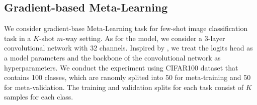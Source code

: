 



\subsection{Gradient-based Meta-Learning}

We consider gradient-base Meta-Learning task for few-shot image classification task \cite{finn2017model} in a $K$-shot $m$-way setting. As for the model, we consider a 3-layer convolutional network with 32 channels. Inspired by \cite{raghu2019rapid, javed2019meta}, we treat the logits head as a model parameters and the backbone of the convolutional network as hyperparameters. We conduct the experiment using CIFAR100 dataset \cite{krizhevsky2009learning} that contains 100 classes, which are ranomly splited into 50 for meta-training and 50 for meta-validation. The training and validation splits for each task consist of $K$ samples for each class.

